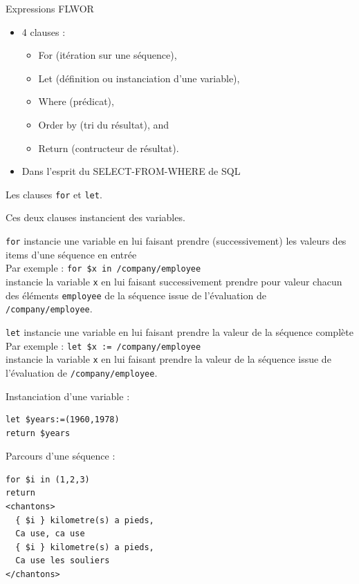 \begin{frame}{Expressions FLWOR }

\begin{itemize}
\item  4 clauses : 
\begin{itemize}
\item  For (itération sur une séquence), 
\item  Let (définition ou instanciation d'une variable), 
\item  Where (prédicat), 
\item  Order by (tri du résultat), and 
\item  Return (contructeur de résultat).
\end{itemize}
\item  Dans l'esprit du SELECT-FROM-WHERE de SQL
\end{itemize}

\framebreak

Les clauses \lstinline!for! et \lstinline!let!.

\bigskip

Ces deux clauses instancient des variables.

\bigskip

\lstinline!for! instancie une variable en lui faisant prendre (successivement) les valeurs des items d'une séquence en entrée\\
\medskip
 Par exemple : \lstinline!for $x in /company/employee! \\
instancie la variable \lstinline!x! en lui faisant successivement prendre pour valeur chacun des éléments \lstinline!employee! de la séquence issue de l'évaluation de \lstinline!/company/employee!.


\bigskip

\lstinline!let! instancie une variable en lui faisant prendre la valeur de la séquence complète\\
\medskip
 Par exemple : \lstinline!let $x := /company/employee!\\
instancie la variable \lstinline!x! en lui faisant prendre la valeur de la séquence issue de l'évaluation de \lstinline!/company/employee!.

\framebreak

Instanciation d'une variable :
\begin{lstlisting}
let $years:=(1960,1978)
return $years
\end{lstlisting}


Parcours d'une séquence :
\begin{lstlisting}
for $i in (1,2,3)
return 
<chantons>
  { $i } kilometre(s) a pieds,
  Ca use, ca use
  { $i } kilometre(s) a pieds,
  Ca use les souliers
</chantons>
\end{lstlisting}
 

\end{frame}
